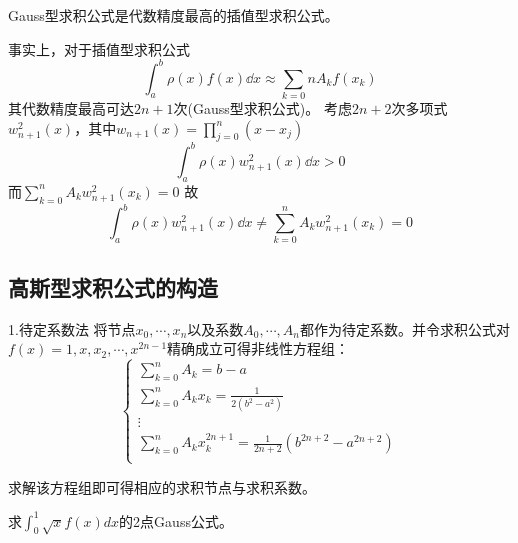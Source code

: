 \begin{notice}
    Gauss型求积公式是代数精度最高的插值型求积公式。
\end{notice}

事实上，对于插值型求积公式
\begin{equation*}
    \int_{a}^{b}\rho(x)f(x)\dd{x}\approx \sum_{k=0}{n}A_kf(x_k)
\end{equation*}
其代数精度最高可达$2n+1$次(Gauss型求积公式)。
考虑$2n+2$次多项式$w_{n+1}^2(x)$，其中$w_{n+1}(x) = \prod_{j=0}^{n}(x-x_j)$
\begin{equation*}
    \int_{a}^{b}\rho(x)w_{n+1}^2(x)\dd{x} > 0
\end{equation*}
而$\sum_{k=0}^{n}A_kw^2_{n+1}(x_k) = 0$
故
\begin{equation*}
    \int_{a}^{b}\rho(x)w_{n+1}^2(x)\dd{x} \neq \sum_{k=0}^{n}A_kw^2_{n+1}(x_k) = 0
\end{equation*}

\subsection{高斯型求积公式的构造}

1.待定系数法
将节点$x_0,\cdots,x_n$以及系数$A_0,\cdots,A_n$都作为待定系数。并令求积公式对$f(x) = 1,x,x_2,\cdots,x^{2n-1}$精确成立可得非线性方程组：
\begin{equation*}
    \begin{cases}
        \sum_{k=0}^{n}A_k = b-a\\
        \sum_{k=0}^{n}A_kx_k = \frac{1}{2(b^2-a^2)}\\
        \vdots \\
        \sum_{k=0}^{n}A_kx_k^{2n+1} = \frac{1}{2n+2}(b^{2n+2}-a^{2n+2})\\
    \end{cases}
\end{equation*}

求解该方程组即可得相应的求积节点与求积系数。
\begin{example}
    求$\int_{0}^{1}\sqrt{x}f(x)dx$的2点Gauss公式。    
\end{example}

